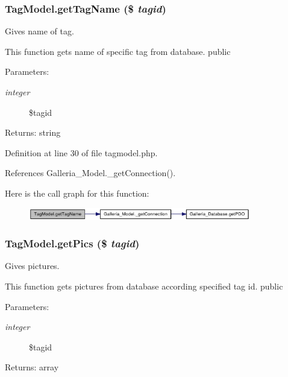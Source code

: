 \subsubsection{\setlength{\rightskip}{0pt plus 5cm}TagModel.getTagName (\$ {\em tagid})}\label{classTagModel_33ed8846746b4db91b538171cf6c5669}


Gives name of tag.

This function gets name of specific tag from database.  public \begin{Desc}
\item[Parameters:]
\begin{description}
\item[{\em integer}]\$tagid \end{description}
\end{Desc}
\begin{Desc}
\item[Returns:]string \end{Desc}


Definition at line 30 of file tagmodel.php.

References Galleria\_\-Model.\_\-getConnection().

Here is the call graph for this function:\nopagebreak
\begin{figure}[H]
\begin{center}
\leavevmode
\includegraphics[width=275pt]{classTagModel_33ed8846746b4db91b538171cf6c5669_cgraph}
\end{center}
\end{figure}
\subsubsection{\setlength{\rightskip}{0pt plus 5cm}TagModel.getPics (\$ {\em tagid})}\label{classTagModel_49a371996b0e0684a5689abd6c160843}


Gives pictures.

This function gets pictures from database according specified tag id.  public \begin{Desc}
\item[Parameters:]
\begin{description}
\item[{\em integer}]\$tagid \end{description}
\end{Desc}
\begin{Desc}
\item[Returns:]array \end{Desc}


